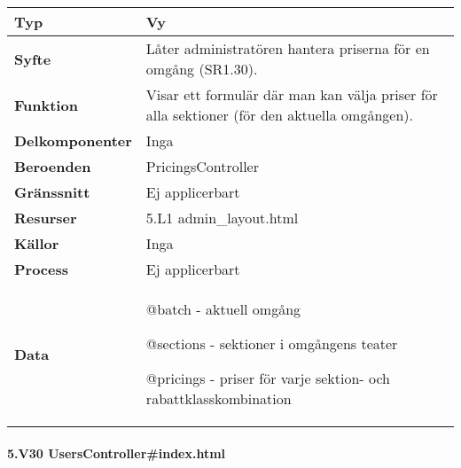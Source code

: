 \documentclass[a4paper, twoside, 11pt, titlepage]{article}
\begin{document}
			\begin {table} [ht] \begin{tabular} {  p{3.5cm} p{11.6cm} }
				\hline
				{\sffamily\textbf{Typ}} & {Vy} \\
				\hline
				{\sffamily\textbf{Syfte}} & {Låter administratören hantera priserna för en omgång (SR1.30).} \\
				\hline
				{\sffamily\textbf{Funktion}} & {Visar ett formulär där  man kan välja priser för alla sektioner (för den aktuella omgången).} \\
				\hline
				{\sffamily\textbf{Delkomponenter}} & {Inga} \\
				\hline
				{\sffamily\textbf{Beroenden}} & {PricingsController} \\
				\hline
				{\sffamily\textbf{Gränssnitt}} & {Ej applicerbart} \\
				\hline
				{\sffamily\textbf{Resurser}} & {5.L1 admin\_layout.html} \\
				\hline
				{\sffamily\textbf{Källor}} & {Inga} \\
				\hline
				{\sffamily\textbf{Process}} & {Ej applicerbart} \\
				\hline
				{\sffamily\textbf{Data}} & {@batch - aktuell omgång

@sections - sektioner i omgångens teater

@pricings - priser för varje sektion- och rabattklasskombination} \\
				\hline
			\end{tabular} \end{table} \FloatBarrier


			\clearpage %
			\paragraph{5.V30 UsersController\#index.html}\
\end{document}
